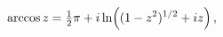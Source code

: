 \[\mathop{\mathrm{arccos}\/}\nolimits z=\tfrac{1}{2}\pi+i\mathop{\ln\/}\nolimits%
\!\left((1-z^{2})^{1/2}+iz\right),\]
